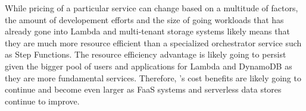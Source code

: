 While pricing of a particular service can change based on a multitude of
factors, the amount of developement efforts and the size of going workloads
that has already gone into Lambda and multi-tenant storage systems likely
means that they are much more resource efficient than a specialized
orchestrator service such as Step Functions. The resource efficiency advantage
is likely going to persist given the bigger pool of users and applications for
Lambda and DynamoDB as they are more fundamental services. Therefore,
\name{}'s cost benefits are likely going to continue and become even larger as
FaaS systems and serverless data stores continue to improve.













